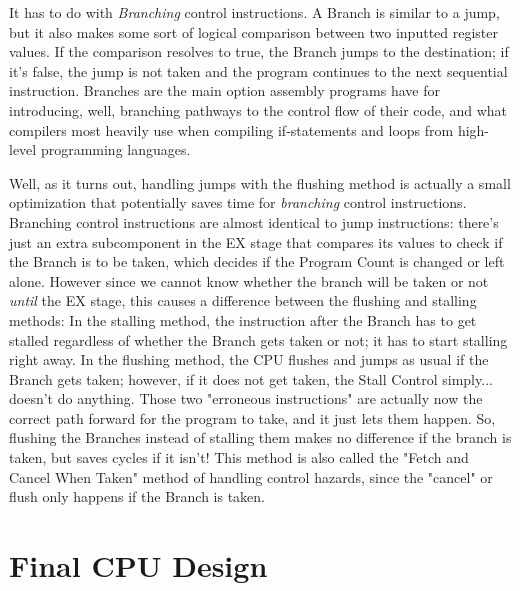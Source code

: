 \documentclass[12pt,twoside]{reedthesis}
\begin{document}
It has to do with \textit{Branching} control instructions. A Branch is similar to a jump, but it also makes some sort of logical comparison between two inputted register values. If the comparison resolves to true, the Branch jumps to the destination; if it's false, the jump is not taken and the program continues to the next sequential instruction. Branches are the main option assembly programs have for introducing, well, branching pathways to the control flow of their code, and what compilers most heavily use when compiling if-statements and loops from high-level programming languages.

Well, as it turns out, handling jumps  with the flushing method is actually a small optimization that potentially saves time for \textit{branching} control instructions. Branching control instructions are almost identical to jump instructions: there's just an extra subcomponent in the EX stage that compares its values to check if the Branch is to be taken, which decides if the Program Count is changed or left alone. However since we cannot know whether the branch will be taken or not \textit{until} the EX stage, this causes a difference between the flushing and stalling methods: In the stalling method, the instruction after the Branch has to get stalled regardless of whether the Branch gets taken or not; it has to start stalling right away. In the flushing method, the CPU flushes and jumps as usual if the Branch gets taken; however, if it does not get taken, the Stall Control simply... doesn't do anything. Those two "erroneous instructions" are actually now the correct path forward for the program to take, and it just lets them happen. So, flushing the Branches instead of stalling them makes no difference if the branch is taken, but saves cycles if it isn't! This method is also called the "Fetch and Cancel When Taken" method of handling control hazards, since the "cancel" or flush only happens if the Branch is taken.

\section{Final CPU Design}
\end{document}
